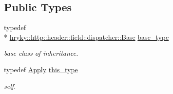 \subsection*{Public Types}
\begin{DoxyCompactItemize}
\item 
\hypertarget{classhryky_1_1http_1_1header_1_1field_1_1dispatcher_1_1_apply_af5c0c79096c8c64eaac662198bb9b2e9}{typedef \\*
\hyperlink{classhryky_1_1http_1_1header_1_1field_1_1dispatcher_1_1_base}{hryky\-::http\-::header\-::field\-::dispatcher\-::\-Base} \hyperlink{classhryky_1_1http_1_1header_1_1field_1_1dispatcher_1_1_apply_af5c0c79096c8c64eaac662198bb9b2e9}{base\-\_\-type}}\label{classhryky_1_1http_1_1header_1_1field_1_1dispatcher_1_1_apply_af5c0c79096c8c64eaac662198bb9b2e9}

\begin{DoxyCompactList}\small\item\em base class of inheritance. \end{DoxyCompactList}\item 
\hypertarget{classhryky_1_1http_1_1header_1_1field_1_1dispatcher_1_1_apply_a4d2826be199b8c44304035ecb71c4ccd}{typedef \hyperlink{classhryky_1_1http_1_1header_1_1field_1_1dispatcher_1_1_apply}{Apply} \hyperlink{classhryky_1_1http_1_1header_1_1field_1_1dispatcher_1_1_apply_a4d2826be199b8c44304035ecb71c4ccd}{this\-\_\-type}}\label{classhryky_1_1http_1_1header_1_1field_1_1dispatcher_1_1_apply_a4d2826be199b8c44304035ecb71c4ccd}

\begin{DoxyCompactList}\small\item\em self. \end{DoxyCompactList}\end{DoxyCompactItemize}
